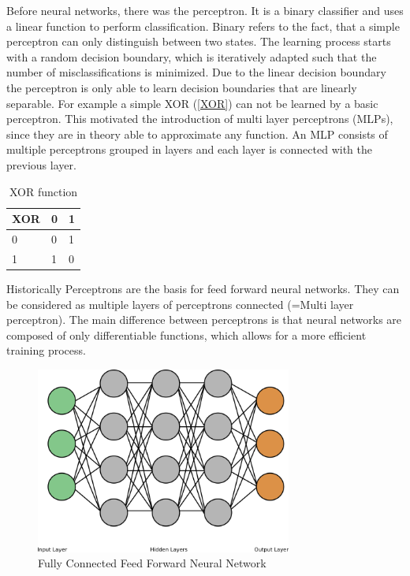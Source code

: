 \documentclass[draft,final,oneside]{vutinfth} %
\begin{document}
Before neural networks, there was the perceptron. It is a binary classifier and uses a linear function to perform classification. Binary refers to the fact, that a simple perceptron can only distinguish between two states. The learning process starts with a random decision boundary, which is iteratively adapted such that the number of misclassifications is minimized. Due to the linear decision boundary the perceptron is only able to learn decision boundaries that are linearly separable. For example a simple XOR (\ref{XOR}) can not be learned by a basic perceptron. This motivated the introduction of multi layer perceptrons (MLPs), since they are in theory able to approximate any function. An MLP consists of multiple perceptrons grouped in layers and each layer is connected with the previous layer.

\begin{table}[]
\centering
\begin{tabular}{|l|l|l|}
\hline
XOR & 0 & 1 \\ \hline
0   & 0 & 1 \\ \hline
1   & 1 & 0 \\ \hline
\end{tabular}
\label{xor}
\caption{XOR function}
\end{table}

Historically Perceptrons are the basis for feed forward neural networks. They can be considered as multiple layers of perceptrons connected (=Multi layer perceptron). The main difference between perceptrons is that neural networks are composed of only differentiable functions, which allows for a more efficient training process.

\begin{figure}[ht]
	\centering
  	\includegraphics[width=0.75\textwidth]{graphics/simple_neural_network.png}
	\caption{Fully Connected Feed Forward Neural Network}
	\label{fig:feedforward}
\end{figure}
\end{document}
